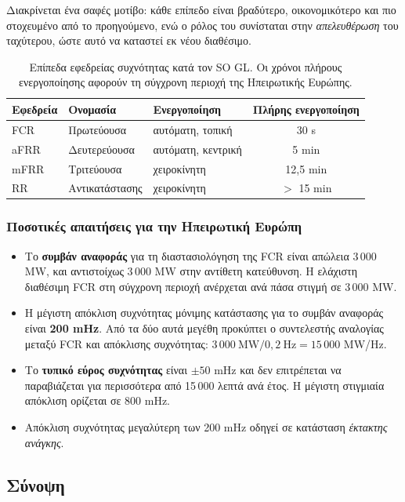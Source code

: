 Διακρίνεται ένα σαφές μοτίβο: κάθε επίπεδο είναι βραδύτερο, οικονομικότερο και πιο
στοχευμένο από το προηγούμενο, ενώ ο ρόλος του συνίσταται στην \emph{απελευθέρωση} του
ταχύτερου, ώστε αυτό να καταστεί εκ νέου διαθέσιμο.

\begin{table}[!htbp]
\centering
\begin{tabular}{lllc}
\hline
Εφεδρεία & Ονομασία & Ενεργοποίηση & Πλήρης ενεργοποίηση \\
\hline
FCR  & Πρωτεύουσα   & αυτόματη, τοπική  & 30 s \\
aFRR & Δευτερεύουσα & αυτόματη, κεντρική & 5 min \\
mFRR & Τριτεύουσα   & χειροκίνητη        & 12,5 min \\
RR   & Αντικατάστασης & χειροκίνητη      & $>$ 15 min \\
\hline
\end{tabular}
\caption{Επίπεδα εφεδρείας συχνότητας κατά τον SO GL. Οι χρόνοι πλήρους ενεργοποίησης
αφορούν τη σύγχρονη περιοχή της Ηπειρωτικής Ευρώπης.}
\label{tab:reserves}
\end{table}

\subsubsection*{Ποσοτικές απαιτήσεις για την Ηπειρωτική Ευρώπη}

\begin{itemize}
\item Το \textbf{συμβάν αναφοράς} για τη διαστασιολόγηση της FCR είναι απώλεια 3\,000 MW,
      και αντιστοίχως 3\,000 MW στην αντίθετη κατεύθυνση. Η ελάχιστη διαθέσιμη FCR στη
      σύγχρονη περιοχή ανέρχεται ανά πάσα στιγμή σε 3\,000 MW.
\item Η μέγιστη απόκλιση συχνότητας μόνιμης κατάστασης για το συμβάν αναφοράς είναι
      \textbf{200 mHz}. Από τα δύο αυτά μεγέθη προκύπτει ο συντελεστής αναλογίας μεταξύ FCR
      και απόκλισης συχνότητας: $3\,000\ \text{MW} / 0{,}2\ \text{Hz} = 15\,000$ MW/Hz.
\item Το \textbf{τυπικό εύρος συχνότητας} είναι $\pm 50$ mHz και δεν επιτρέπεται να
      παραβιάζεται για περισσότερα από 15\,000 λεπτά ανά έτος. Η μέγιστη στιγμιαία απόκλιση
      ορίζεται σε 800 mHz.
\item Απόκλιση συχνότητας μεγαλύτερη των 200 mHz οδηγεί σε κατάσταση \emph{έκτακτης
      ανάγκης}.
\end{itemize}

\subsection{Σύνοψη}

